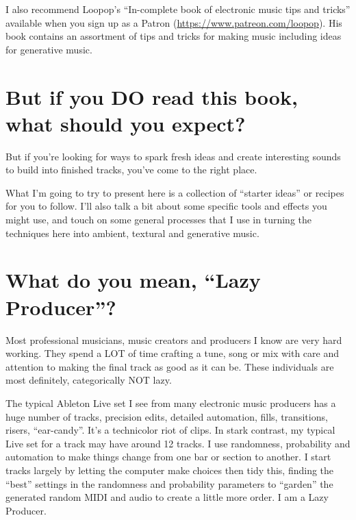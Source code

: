 \documentclass[
  12pt,
  letterpaper,
  oneside,
  open=any]{scrbook}
\begin{document}
I also recommend Loopop's ``In-complete book of electronic music tips
and tricks'' available when you sign up as a Patron
(\url{https://www.patreon.com/loopop}). His book contains an assortment
of tips and tricks for making music including ideas for generative
music.

\section*{But if you DO read this book, what should you
expect?}\label{but-if-you-do-read-this-book-what-should-you-expect}


But if you're looking for ways to spark fresh ideas and create
interesting sounds to build into finished tracks, you've come to the
right place.

What I'm going to try to present here is a collection of ``starter
ideas'' or recipes for you to follow. I'll also talk a bit about some
specific tools and effects you might use, and touch on some general
processes that I use in turning the techniques here into ambient,
textural and generative music.

\section*{What do you mean, ``Lazy
Producer''?}\label{what-do-you-mean-lazy-producer}


Most professional musicians, music creators and producers I know are
very hard working. They spend a LOT of time crafting a tune, song or mix
with care and attention to making the final track as good as it can be.
These individuals are most definitely, categorically NOT lazy.

The typical Ableton Live set I see from many electronic music producers
has a huge number of tracks, precision edits, detailed automation,
fills, transitions, risers, ``ear-candy''. It's a technicolor riot of
clips. In stark contrast, my typical Live set for a track may have
around 12 tracks. I use randomness, probability and automation to make
things change from one bar or section to another. I start tracks largely
by letting the computer make choices then tidy this, finding the
``best'' settings in the randomness and probability parameters to
``garden'' the generated random MIDI and audio to create a little more
order. I am a Lazy Producer.
\end{document}
